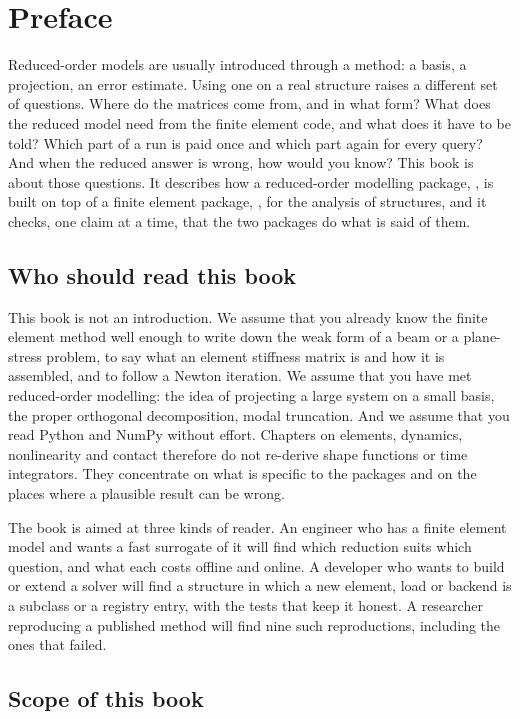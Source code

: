 \chapter*{Preface}

Reduced-order models are usually introduced through a method: a basis, a projection, an error estimate. Using one on a real structure raises a different set of questions. Where do the matrices come from, and in what form? What does the reduced model need from the finite element code, and what does it have to be told? Which part of a run is paid once and which part again for every query? And when the reduced answer is wrong, how would you know? This book is about those questions. It describes how a reduced-order modelling package, \rom{}, is built on top of a finite element package, \fea{}, for the analysis of structures, and it checks, one claim at a time, that the two packages do what is said of them.



\section*{Who should read this book}

This book is not an introduction. We assume that you already know the finite element method well enough to write down the weak form of a beam or a plane-stress problem, to say what an element stiffness matrix is and how it is assembled, and to follow a Newton iteration. We assume that you have met reduced-order modelling: the idea of projecting a large system on a small basis, the proper orthogonal decomposition, modal truncation. And we assume that you read Python and NumPy without effort. Chapters on elements, dynamics, nonlinearity and contact therefore do not re-derive shape functions or time integrators. They concentrate on what is specific to the packages and on the places where a plausible result can be wrong.

The book is aimed at three kinds of reader. An engineer who has a finite element model and wants a fast surrogate of it will find which reduction suits which question, and what each costs offline and online. A developer who wants to build or extend a solver will find a structure in which a new element, load or backend is a subclass or a registry entry, with the tests that keep it honest. A researcher reproducing a published method will find nine such reproductions, including the ones that failed.

\section*{Scope of this book}

